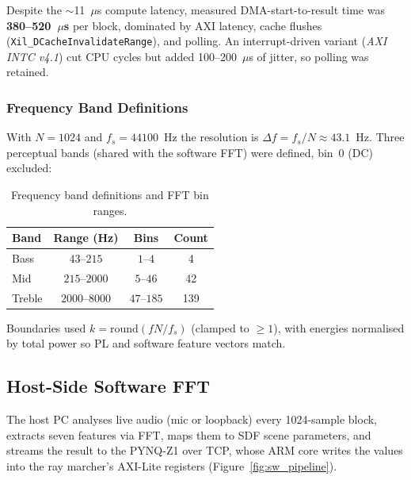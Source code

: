 Despite the $\sim$11~$\mu$s compute latency, measured DMA-start-to-result time
was \textbf{380--520~$\mu$s} per block, dominated by AXI latency, cache flushes
(\texttt{Xil\_DCacheInvalidateRange}), and polling. An interrupt-driven variant
(\textit{AXI INTC v4.1}) cut CPU cycles but added 100--200~$\mu$s of jitter, so
polling was retained.

\subsubsection{Frequency Band Definitions}
\label{sssec:fft_bands}

With $N=1024$ and $f_s=44100$~Hz the resolution is $\Delta f=f_s/N\approx43.1$~Hz.
Three perceptual bands (shared with the software FFT) were defined, bin~0 (DC)
excluded:

\begin{table}[h]
\centering
\caption{Frequency band definitions and FFT bin ranges.}
\label{tab:fft_bands}
\begin{tabular}{lccc}
\toprule
\textbf{Band} & \textbf{Range (Hz)} & \textbf{Bins} & \textbf{Count} \\
\midrule
Bass   & $43$--$215$   & $1$--$4$    & 4   \\
Mid    & $215$--$2000$ & $5$--$46$   & 42  \\
Treble & $2000$--$8000$& $47$--$185$ & 139 \\
\bottomrule
\end{tabular}
\end{table}

Boundaries used $k=\mathrm{round}(fN/f_s)$ (clamped to $\geq1$), with energies
normalised by total power so PL and software feature vectors match.

\subsection{Host-Side Software FFT}
\label{ssec:host_fft}

The host PC analyses live audio (mic or loopback) every 1024-sample block,
extracts seven features via FFT, maps them to SDF scene parameters, and streams
the result to the PYNQ-Z1 over TCP, whose ARM core writes the values into the
ray marcher's AXI-Lite registers (Figure~\ref{fig:sw_pipeline}).

